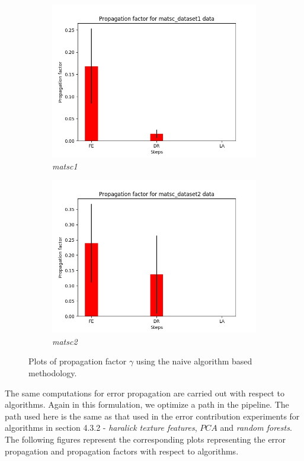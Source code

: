\begin{figure}[H]
\begin{subfigure}{.5\textwidth}
  \includegraphics[scale=0.4]{img/EP/propagation_factor_random_pipeline_matsc_dataset1}
  \caption{\textit{matsc1}}
  \label{fig:sfig3}
\end{subfigure}%
\begin{subfigure}{.5\textwidth}
  \centering
  \includegraphics[scale=0.4]{img/EP/propagation_factor_random_pipeline_matsc_dataset2}
  \caption{\textit{matsc2}}
  \label{fig:sfig4}
\end{subfigure}

\caption{Plots of propagation factor $\gamma$ using the naive algorithm based methodology.}
\label{fig:fig}
\end{figure}

The same computations for error propagation are carried out with respect to algorithms. Again in this formulation, we optimize a path in the pipeline. The path used here is the same as that used in the error contribution experiments for algorithms in section 4.3.2 - \textit{haralick texture features}, $PCA$ and \textit{random forests}. The following figures represent the corresponding plots representing the error propagation and propagation factors with respect to algorithms.

